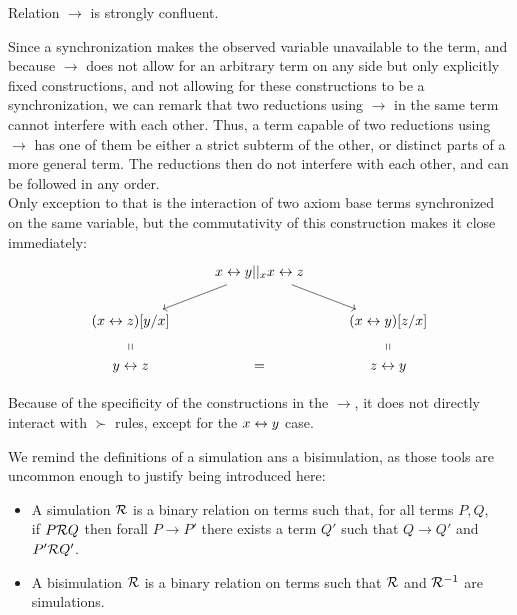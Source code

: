 \begin{proposition}
Relation $\to$ is strongly confluent.
\end{proposition}

\begin{myproof}
Since a synchronization makes the observed variable unavailable to the term, and because $\to$ does not allow for an arbitrary term on any side but only explicitly fixed constructions, and not allowing for these constructions to be a synchronization, we can remark that two reductions using $\to$ in the same term cannot interfere with each other. Thus, a term capable of two reductions using $\to$ has one of them be either a strict subterm of the other, or distinct parts of a more general term. The reductions then do not interfere with each other, and can be followed in any order.\\
Only exception to that is the interaction of two axiom base terms synchronized on the same variable, but the commutativity of this construction makes it close immediately:\\
\[\begin{tikzcd}
& x\tto y ||_x x\tto z \arrow[dl] \arrow[dr] &\\
(x\tto z)[y/x]\arrow[d, phantom, "\shortparallel"] & & (x\tto y)[z/x]\arrow[d, phantom, "\shortparallel"]\\
y\tto z & = & z\tto y
\end{tikzcd}\]
\end{myproof}

Because of the specificity of the constructions in the $\to$, it does not directly interact with $\succ$ rules, except for the $x\leftrightarrow y$ case.

We remind the definitions of a simulation ans a bisimulation, as those tools are uncommon enough to justify being introduced here:

\begin{definition}
\begin{itemize}
	\item A simulation $\mathcal{R}$ is a binary relation on terms such that, for all terms $P,Q$,\\
		if $P \mathcal{R} Q$ then forall $P \to P'$ there exists a term $Q'$ such that $Q \to Q'$ and $P' \mathcal{R} Q'$.
	\item A bisimulation $\mathcal{R}$ is a binary relation on terms such that $\mathcal{R}$ and $\mathcal{R}^{-1}$ are simulations.
\end{itemize}
\end{definition}


